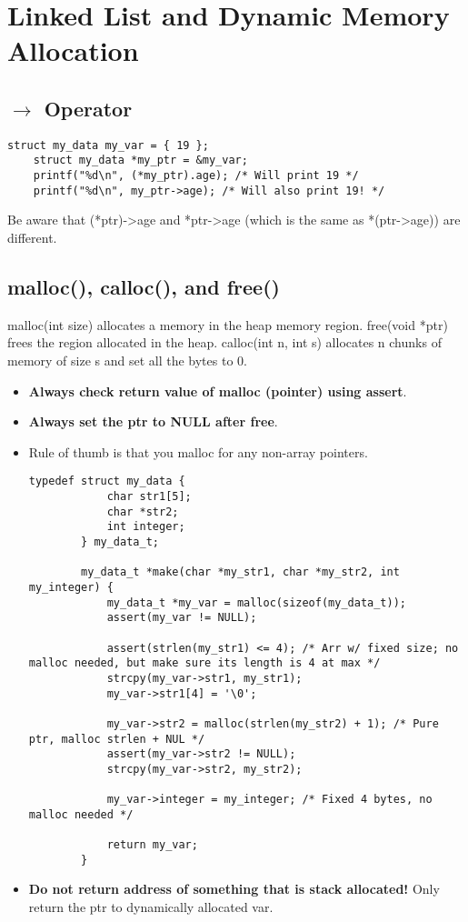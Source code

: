 \documentclass{article}
\begin{document}
\section{Linked List and Dynamic Memory Allocation}

\subsection{$\rightarrow$ Operator}
\begin{lstlisting}[style=CStyle]
    struct my_data my_var = { 19 };
    struct my_data *my_ptr = &my_var;
    printf("%d\n", (*my_ptr).age); /* Will print 19 */
    printf("%d\n", my_ptr->age); /* Will also print 19! */
\end{lstlisting}
Be aware that (*ptr)-\textgreater age and *ptr-\textgreater age (which is the same as *(ptr-\textgreater age)) are different.

\subsection{malloc(), calloc(), and free()}
malloc(int size) allocates a memory in the heap memory region. free(void *ptr) frees the region allocated in the heap.
calloc(int n, int s) allocates n chunks of memory of size s and set all the bytes to 0.
\begin{itemize}
    \item \textbf{Always check return value of malloc (pointer) using assert}.
    \item \textbf{Always set the ptr to NULL after free}.
    \item Rule of thumb is that you malloc for any non-array pointers.
    \begin{lstlisting}[style=CStyle]
        typedef struct my_data {
            char str1[5];
            char *str2;
            int integer;
        } my_data_t;

        my_data_t *make(char *my_str1, char *my_str2, int my_integer) {
            my_data_t *my_var = malloc(sizeof(my_data_t));
            assert(my_var != NULL);

            assert(strlen(my_str1) <= 4); /* Arr w/ fixed size; no malloc needed, but make sure its length is 4 at max */
            strcpy(my_var->str1, my_str1);
            my_var->str1[4] = '\0';

            my_var->str2 = malloc(strlen(my_str2) + 1); /* Pure ptr, malloc strlen + NUL */
            assert(my_var->str2 != NULL);
            strcpy(my_var->str2, my_str2);

            my_var->integer = my_integer; /* Fixed 4 bytes, no malloc needed */

            return my_var;
        }
    \end{lstlisting}
    \item \textbf{Do not return address of something that is stack allocated!} Only return the ptr to dynamically allocated var.
\end{itemize}
\end{document}
